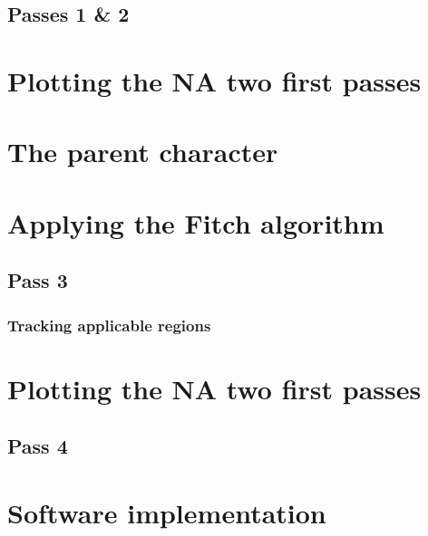 \documentclass[]{book}
\theoremstyle{definition}
\theoremstyle{definition}
\theoremstyle{definition}
\theoremstyle{remark}
\begin{document}
\hypertarget{passes-1-2}{%
\subsection{Passes 1 \& 2}\label{passes-1-2}}

\hypertarget{plotting-the-na-two-first-passes}{%
\section{Plotting the NA two first
passes}\label{plotting-the-na-two-first-passes}}

\hypertarget{the-parent-character}{%
\section{The parent character}\label{the-parent-character}}

\hypertarget{applying-the-fitch-algorithm-1}{%
\section{Applying the Fitch
algorithm}\label{applying-the-fitch-algorithm-1}}

\hypertarget{pass-3}{%
\subsection{Pass 3}\label{pass-3}}

\hypertarget{tracking-applicable-regions}{%
\subsubsection{Tracking applicable
regions}\label{tracking-applicable-regions}}

\hypertarget{plotting-the-na-two-first-passes-1}{%
\section{Plotting the NA two first
passes}\label{plotting-the-na-two-first-passes-1}}

\hypertarget{pass-4}{%
\subsection{Pass 4}\label{pass-4}}

\hypertarget{software}{%
\section{Software implementation}\label{software}}
\end{document}
